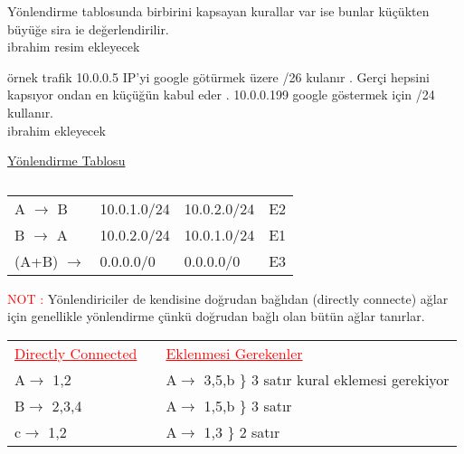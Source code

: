 Yönlendirme  tablosunda  birbirini kapsayan kurallar var ise bunlar küçükten büyüğe sira ie değerlendirilir.\\

ibrahim resim ekleyecek

örnek trafik 10.0.0.5 IP'yi google götürmek üzere /26 kulanır . Gerçi hepsini kapsıyor ondan en küçüğün kabul eder . 10.0.0.199 google göstermek için /24 kullanır.\\

ibrahim  ekleyecek \\
\begin{center}
 \underline{Yönlendirme Tablosu}
\end{center}
\begin{table}[h]
   \centering
   
   \begin{tabular}{llll}
   A $\rightarrow$ B & 10.0.1.0/24 & 10.0.2.0/24 & E2\\
   B $\rightarrow$ A & 10.0.2.0/24 & 10.0.1.0/24 & E1\\
   (A+B)    $\rightarrow$  & 0.0.0.0/0 & 0.0.0.0/0 & E3
  \end{tabular}
  \caption{}    
\end{table}

\textcolor{red}{NOT : } Yönlendiriciler de kendisine doğrudan bağlıdan (directly connecte) ağlar için genellikle yönlendirme  çünkü doğrudan bağlı olan bütün ağlar tanırlar.

\begin{table}[h]
   \centering
   \begin{tabular}{lll}
   \textcolor{red}{\underline{Directly Connected}}&   
   & \textcolor{red}{\underline{Eklenmesi Gerekenler}}\\
   A$\rightarrow$ 1,2 && A$\rightarrow$ 3,5,b \} 3 satır kural eklemesi gerekiyor\\
   B$\rightarrow$ 2,3,4 && A$\rightarrow$ 1,5,b \} 3 satır\\
   c$\rightarrow$ 1,2 &&A$\rightarrow$ 1,3 \} 2 satır \\
  \end{tabular}
\end{table}
